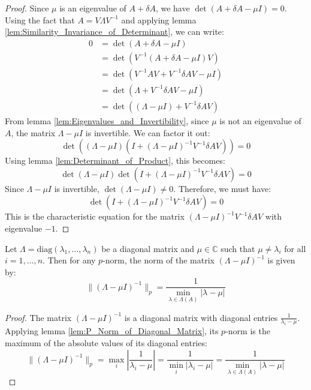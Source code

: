 \begin{proof}
    Since $\mu$ is an eigenvalue of $A + \delta A$, we have $\det(A + \delta A - \mu I) = 0$. Using the fact that $A = V\Lambda V^{-1}$ and applying lemma \ref{lem:Similarity_Invariance_of_Determinant}, we can write:
    \begin{align*}
        0 &= \det(A + \delta A - \mu I) \\
          &= \det\left(V^{-1}(A + \delta A - \mu I)V\right) \\
          &= \det\left(V^{-1}AV + V^{-1}\delta A V - \mu I\right) \\
          &= \det\left(\Lambda + V^{-1}\delta A V - \mu I\right) \\
          &= \det\left((\Lambda - \mu I) + V^{-1}\delta A V\right)
    \end{align*}
    From lemma \ref{lem:Eigenvalues_and_Invertibility}, since $\mu$ is not an eigenvalue of $A$, the matrix $\Lambda - \mu I$ is invertible. We can factor it out:
    \[ \det\left((\Lambda - \mu I) \left(I + (\Lambda - \mu I)^{-1}V^{-1}\delta A V\right)\right) = 0 \]
    Using lemma \ref{lem:Determinant_of_Product}, this becomes:
    \[ \det(\Lambda - \mu I) \det\left(I + (\Lambda - \mu I)^{-1}V^{-1}\delta A V\right) = 0 \]
    Since $\Lambda - \mu I$ is invertible, $\det(\Lambda - \mu I) \neq 0$. Therefore, we must have:
    \[ \det\left(I + (\Lambda - \mu I)^{-1}V^{-1}\delta A V\right) = 0 \]
    This is the characteristic equation for the matrix $(\Lambda - \mu I)^{-1}V^{-1}\delta A V$ with eigenvalue $-1$.
\end{proof}

\begin{lemma}
    \label{lem:Norm_of_Inverse_Diagonal_Matrix}
    Let $\Lambda = \text{diag}(\lambda_1, \dots, \lambda_n)$ be a diagonal matrix and $\mu \in \mathbb{C}$ such that $\mu \neq \lambda_i$ for all $i=1, \dots, n$. Then for any $p$-norm, the norm of the matrix $(\Lambda - \mu I)^{-1}$ is given by:
    \[ \|(\Lambda - \mu I)^{-1}\|_p = \frac{1}{\min_{\lambda \in \Lambda(A)} |\lambda - \mu|} \]
\end{lemma}

\begin{proof}
    The matrix $(\Lambda - \mu I)^{-1}$ is a diagonal matrix with diagonal entries $\frac{1}{\lambda_i - \mu}$. Applying lemma \ref{lem:P_Norm_of_Diagonal_Matrix}, its $p$-norm is the maximum of the absolute values of its diagonal entries:
    \[ \|(\Lambda - \mu I)^{-1}\|_p = \max_{i} \left| \frac{1}{\lambda_i - \mu} \right| = \frac{1}{\min_{i} |\lambda_i - \mu|} = \frac{1}{\min_{\lambda \in \Lambda(A)} |\lambda - \mu|} \]
\end{proof}

